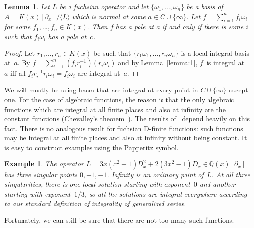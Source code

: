 \documentclass[final,1p,times,authoryear]{elsarticle}
\newtheorem{lemma}[theorem]{Lemma}
\newtheorem{example}[theorem]{Example}
\def\<#1>{\langle#1\rangle}
\let\set\mathbb
\begin{document}
\begin{lemma}\label{lemma:3}
  Let $L$ be a fuchsian operator and let $\{\omega_1,\dots,\omega_n\}$ be a basis of $A=K(x)[\partial_x]/\<L>$
  which is normal at some $a\in\bar C\cup\{\infty\}$.
  Let $f=\sum_{i=1}^n f_i\omega_i$ for some $f_1,\dots,f_n\in K(x)$.
  Then $f$ has a pole at $a$ if and only if
  there is some $i$ such that $f_i\omega_i$ has a pole at~$a$.
\end{lemma}
\begin{proof}
  Let $r_1,\dots,r_n\in K(x)$ be such that $\{r_1\omega_1,\dots,r_n\omega_n\}$ is a
  local integral basis at~$a$. By $f=\sum_{i=1}^n
  (f_ir_i^{-1})(r_i\omega_i)$ and by Lemma~\ref{lemma:1}, $f$~is integral at~$a$ iff all
  $f_ir_i^{-1}r_i\omega_i=f_i\omega_i$ are integral at~$a$.
\end{proof}

We will mostly be using bases that are integral at every point in $\bar C\cup\{\infty\}$ except one.
For the case of algebraic functions, the reason is that the only algebraic functions which are
integral at all finite places and also at infinity are the constant functions (Chevalley's
theorem~\citep[p.~9, Cor.~3]{Chevalley1951}). The results of~\cite{chen16}
depend heavily on this fact. There is no analogous result for fuchsian D-finite functions: such
functions may be integral at all finite places and also at infinity without being constant.
It is easy to construct examples using the Papperitz symbol.

\begin{example}\label{example:integral-everywhere}
  The operator $L = 3 x(x^2-1) D_x^2 + 2 (3x^2 - 1) D_x\in\set Q(x)[\partial_x]$
  has three singular points $0,+1,-1$. Infinity is an ordinary point of~$L$.
  At all three singularities, there is one local solution starting with exponent~$0$
  and another starting with exponent~$1/3$, so all the solutions are integral
  everywhere according to our standard definition of integrality of generalized
  series.
\end{example}

Fortunately, we can still be sure that there are not too many such functions.
\end{document}
